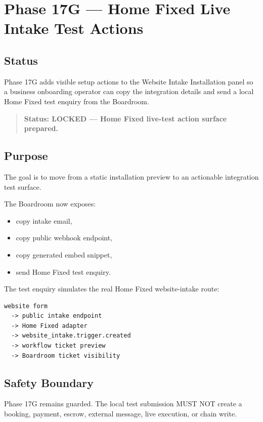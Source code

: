 \section{Phase 17G --- Home Fixed Live Intake Test Actions}
\label{sec:aion-phase17g-home-fixed-live-test-actions}

\subsection{Status}

Phase 17G adds visible setup actions to the Website Intake Installation panel so a business onboarding operator can copy the integration details and send a local Home Fixed test enquiry from the Boardroom.

\begin{quote}
\textbf{Status: LOCKED --- Home Fixed live-test action surface prepared.}
\end{quote}

\subsection{Purpose}

The goal is to move from a static installation preview to an actionable integration test surface.

The Boardroom now exposes:

\begin{itemize}
  \item copy intake email,
  \item copy public webhook endpoint,
  \item copy generated embed snippet,
  \item send Home Fixed test enquiry.
\end{itemize}

The test enquiry simulates the real Home Fixed website-intake route:

\begin{verbatim}
website form
  -> public intake endpoint
  -> Home Fixed adapter
  -> website_intake.trigger.created
  -> workflow ticket preview
  -> Boardroom ticket visibility
\end{verbatim}

\subsection{Safety Boundary}

Phase 17G remains guarded. The local test submission MUST NOT create a booking, payment, escrow, external message, live execution, or chain write.

